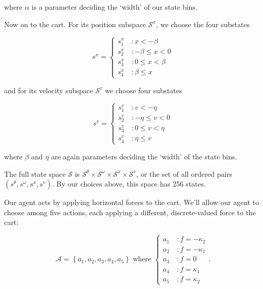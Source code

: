 \documentclass[12pt]{article}
\begin{document}
where $\alpha$ is a parameter deciding the `width' of our state bins.

Now on to the cart. For its position subspace $\mathscr{S}^x$, we choose the four substates

\begin{equation}
s^x = \left\{
\begin{array}{lr}
s_1^x \quad : x < -\beta \\
s_2^x \quad : -\beta \leq x < 0 \\
s_3^x \quad : 0 \leq x < \beta \\
s_4^x \quad : \beta \leq x
\end{array}
\right.
\end{equation}

and for its velocity subspace $\mathscr{S}^v$ we choose four substates

\begin{equation}
s^v = \left\{
\begin{array}{lr}
s_1^v \quad : v < -\eta \\
s_2^v \quad : -\eta \leq v < 0 \\
s_3^v \quad : 0 \leq v < \eta \\
s_4^v \quad : \eta \leq v
\end{array}
\right.
\end{equation}

where $\beta$ and $\eta$ are again parameters deciding the `width' of the state bins.

The full state space $\mathscr{S}$ is $\mathscr{S}^\theta \times \mathscr{S}^\omega \times \mathscr{S}^x \times \mathscr{S}^v$, or the set of all ordered pairs $(s^\theta, s^\omega, s^x, s^v)$. By our choices above, this space has 256 states.

Our agent acts by applying horizontal forces to the cart. We'll allow our agent to choose among five actions, each applying a different, discrete-valued force to the cart:

\begin{equation}
\mathscr{A} = \left\{a_1, a_2, a_3, a_4, a_5\right\} \mbox{ where }\left\{
\begin{array}{lr}
a_1 \quad : f = -\kappa_2 \\
a_2 \quad : f = -\kappa_1 \\
a_3 \quad : f = 0 \\
a_4 \quad : f = \kappa_1 \\
a_5 \quad : f = \kappa_2
\end{array}
\right.
.
\end{equation}
\end{document}
